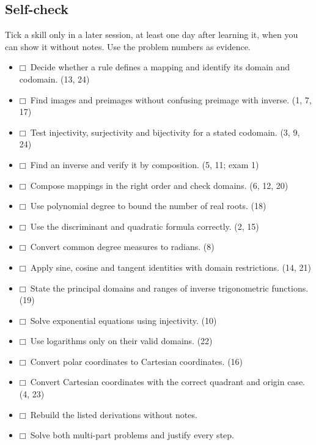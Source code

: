 \documentclass[11pt]{article}
\begin{document}
\begin{keepsection}
\section{Self-check}

Tick a skill only in a later session, at least one day after learning it, when you can show it without notes. Use the problem numbers as evidence.

\begin{itemize}
\item $\mdlgwhtsquare$\ Decide whether a rule defines a mapping and identify its domain and codomain. (13, 24)
\item $\mdlgwhtsquare$\ Find images and preimages without confusing preimage with inverse. (1, 7, 17)
\item $\mdlgwhtsquare$\ Test injectivity, surjectivity and bijectivity for a stated codomain. (3, 9, 24)
\item $\mdlgwhtsquare$\ Find an inverse and verify it by composition. (5, 11; exam 1)
\item $\mdlgwhtsquare$\ Compose mappings in the right order and check domains. (6, 12, 20)
\item $\mdlgwhtsquare$\ Use polynomial degree to bound the number of real roots. (18)
\item $\mdlgwhtsquare$\ Use the discriminant and quadratic formula correctly. (2, 15)
\item $\mdlgwhtsquare$\ Convert common degree measures to radians. (8)
\item $\mdlgwhtsquare$\ Apply sine, cosine and tangent identities with domain restrictions. (14, 21)
\item $\mdlgwhtsquare$\ State the principal domains and ranges of inverse trigonometric functions. (19)
\item $\mdlgwhtsquare$\ Solve exponential equations using injectivity. (10)
\item $\mdlgwhtsquare$\ Use logarithms only on their valid domains. (22)
\item $\mdlgwhtsquare$\ Convert polar coordinates to Cartesian coordinates. (16)
\item $\mdlgwhtsquare$\ Convert Cartesian coordinates with the correct quadrant and origin case. (4, 23)
\item $\mdlgwhtsquare$\ Rebuild the listed derivations without notes.
\item $\mdlgwhtsquare$\ Solve both multi-part problems and justify every step.
\end{itemize}
\end{keepsection}
\end{document}
